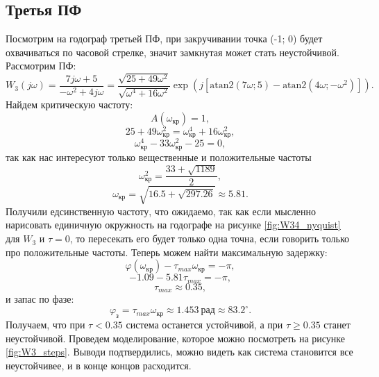 \subsection{Третья ПФ}
Посмотрим на годограф третьей ПФ, при закручивании
точка (-1; 0) будет охвачиваться по часовой стрелке, значит замкнутая 
может стать неустойчивой.
Рассмотрим ПФ:
\begin{equation*}
    W_3(j\omega)=\frac{7j\omega+5}{-\omega^2+4j\omega}
    =\frac{\sqrt{25+49\omega^2}}{\sqrt{\omega^4+16\omega^2}}\exp \left( j \left[ \text{atan2}(7\omega;5) - \text{atan2}(4\omega;-\omega^2) \right] \right).
\end{equation*}
Найдем критическую частоту:
\begin{equation*}
    A(\omega_\text{кр})=1,
\end{equation*}
$$
25+49\omega_\text{кр}^2=\omega_\text{кр}^4+16\omega_\text{кр}^2,
$$
\begin{equation*}
    \omega_\text{кр}^4-33\omega_\text{кр}^2-25=0,
\end{equation*}
так как нас интересуют только вещественные и положительные частоты
\begin{equation*}
    \omega_\text{кр}^2=\frac{33+\sqrt{1189}}{2},
\end{equation*}
\begin{equation*}
    \omega_\text{кр}=\sqrt{16.5+\sqrt{297.26}}\approx 5.81.
\end{equation*}
Получили едсинственную частоту, что ожидаемо, так как если мысленно нарисовать
единичную окружность на годографе на рисунке \ref{fig:W34_nyquist} для $W_3$ и $\tau=0$,
то пересекать его будет только одна точна, если говорить только про положительные частоты.
Теперь можем найти максимальную задержку:
\begin{equation*}
    \varphi(\omega_\text{кр}) - \tau_{max}\omega_\text{кр}=-\pi,
\end{equation*}
\begin{equation*}
    -1.09-5.81\tau_{max}=-\pi,
\end{equation*}
\begin{equation*}
    \tau_{max} \approx 0.35,
\end{equation*}
и запас по фазе:
\begin{equation*}
    \varphi_\text{з}=\tau_{max}\omega_\text{кр}\approx 1.453\ \text{рад}\approx 83.2^{\circ} .
\end{equation*}
Получаем, что при $\tau<0.35$ система останется устойчивой, а при $\tau\geq 0.35$ 
станет неустойчивой. Проведем моделирование, которое можно посмотреть на рисунке \ref{fig:W3_steps}.
Выводи подтвердились, можно видеть как система становится все неустойчивее, и в конце концов
расходится.

